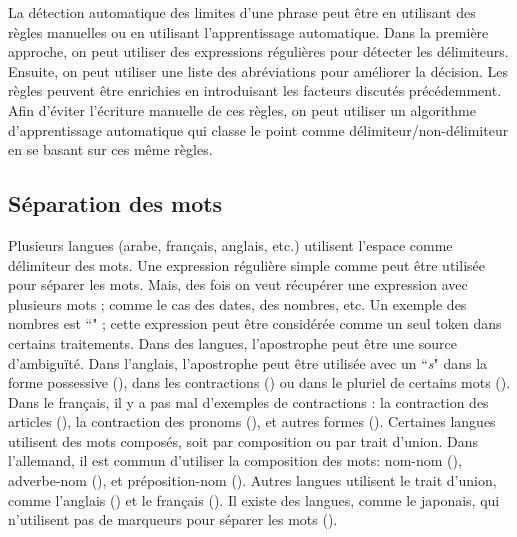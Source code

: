 \documentclass{KodeBook}
\begin{document}
La détection automatique des limites d'une phrase peut être en utilisant des règles manuelles ou en utilisant l'apprentissage automatique. 
Dans la première approche, on peut utiliser des expressions régulières pour détecter les délimiteurs. 
Ensuite, on peut utiliser une liste des abréviations pour améliorer la décision. 
Les règles peuvent être enrichies en introduisant les facteurs discutés précédemment. 
Afin d'éviter l'écriture manuelle de ces règles, on peut utiliser un algorithme d'apprentissage automatique qui classe le point comme délimiteur/non-délimiteur en se basant sur ces même règles.


\subsection{Séparation des mots}

Plusieurs langues (arabe, français, anglais, etc.) utilisent l'espace comme délimiteur des mots.
Une expression régulière simple comme \expword{/[ ]+/} peut être utilisée pour séparer les mots. 
Mais, des fois on veut récupérer une expression avec plusieurs mots ; comme le cas des dates, des nombres, etc. 
Un exemple des nombres est ``" ; cette expression peut être considérée comme un seul token dans certains traitements.
Dans des langues, l'apostrophe peut être une source d'ambiguïté. 
Dans l'anglais, l'apostrophe peut être utilisée avec un ``\textit{s}" dans la forme possessive (), dans les contractions () ou dans le pluriel de certains mots (). 
Dans le français, il y a pas mal d'exemples de contractions : la contraction des articles (), la contraction des pronoms (), et autres formes ().
Certaines langues utilisent des mots composés, soit par composition ou par trait d'union. 
Dans l'allemand, il est commun d'utiliser la composition des mots: nom-nom (), adverbe-nom (), et préposition-nom (). 
Autres langues utilisent le trait d'union, comme l'anglais () et le français (). 
Il existe des langues, comme le japonais, qui n'utilisent pas de marqueurs pour séparer les mots ().
\end{document}
